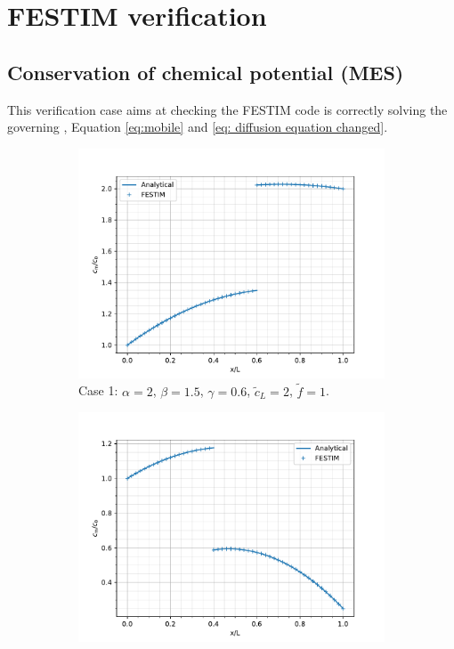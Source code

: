 \chapter{FESTIM verification}\label{appendix verification}

\section{Conservation of chemical potential (MES)}
This verification case aims at checking the FESTIM code is correctly solving the governing , Equation \ref{eq:mobile} and \ref{eq: diffusion equation changed}.

\begin{figure} [h]
    \centering
    \begin{subfigure}{0.5\linewidth}
        \centering
        \includegraphics[width=\linewidth]{Figures/Chapter3/monoblocks/interface_condition/out_MES_case1.pdf}
        \caption{Case 1: $\alpha = 2$, $\beta = 1.5$, $\gamma=0.6$, $\tilde{c}_L = 2$, $\tilde{f}=1$.}
    \end{subfigure}%
    \begin{subfigure}{0.5\linewidth}
        \centering
        \includegraphics[width=\linewidth]{Figures/Chapter3/monoblocks/interface_condition/out_MES_case2.pdf}

\end{subfigure}
\end{figure}
